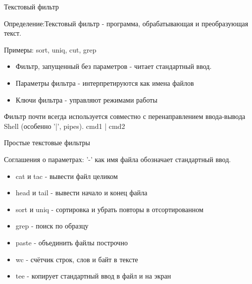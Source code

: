 \begin{frame}{Текстовый фильтр}

  Определение:\newline \alert{Текстовый фильтр} - программа, обрабатывающая и преобразующая текст. \newline

  Примеры: \alert{sort}, \alert{uniq}, \alert{cut}, \alert{grep} \pause
  \begin{itemize}
    \item Фильтр, запущенный без параметров - читает стандартный ввод.
    \item Параметры фильтра - интерпретируются как имена файлов
    \item Ключи фильтра - управляют режимами работы
  \end{itemize} \pause

  Фильтр почти всегда используется совместно с перенаправлением ввода-вывода Shell (особенно '|', pipes). cmd1 | cmd2

\end{frame}

\begin{frame}{Простые текстовые фильтры}

  Соглашения о параметрах: \alert{'-'} как имя файла обозначает стандартный ввод.

  \begin{itemize}
    \item \alert{cat} и \alert{tac} - вывести файл целиком \pause
    \item \alert{head} и \alert{tail} - вывести начало и конец файла \pause
    \item \alert{sort} и \alert{uniq} - сортировка и убрать повторы в отсортированном \pause
    \item \alert{grep} - поиск по образцу \pause
    \item \alert{paste} - объединить файлы построчно \pause
    \item \alert{wc} - счётчик строк, слов и байт в тексте \pause
    \item \alert{tee} - копирует стандартный ввод в файл и на экран

  \end{itemize}
\end{frame}

